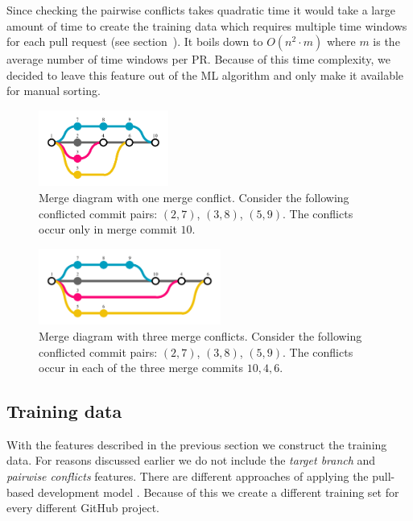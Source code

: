 Since checking the pairwise conflicts takes quadratic time it would take a large amount of time to create the training data which requires multiple time windows for each pull request (see section~\label{sec:training}).
It boils down to $O(n^2 \cdot m)$ where $m$ is the average number of time windows per PR.
Because of this time complexity, we decided to leave this feature out of the ML algorithm and only make it available for manual sorting.

\begin{figure}
  \centering
  \includegraphics[height=25mm, clip ,trim = 0mm 7mm 0mm 7mm]{../figs/conflicts-1.pdf}
  \caption[Merge diagram with one conflict]
   {Merge diagram with one merge conflict.
   Consider the following conflicted commit pairs: $(2,7)$, $(3,8)$, $(5,9)$.
   The conflicts occur only in merge commit $10$.}
  \label{fig:conflicts-1}
\end{figure}

\begin{figure}
  \centering
  \includegraphics[height=25mm, clip ,trim = 0mm 7mm 0mm 7mm]{../figs/conflicts-3.pdf}
  \caption[Merge diagram with three merge conflicts]
   {Merge diagram with three merge conflicts.
   Consider the following conflicted commit pairs: $(2,7)$, $(3,8)$, $(5,9)$.
   The conflicts occur in each of the three merge commits $10,4,6$.}
  \label{fig:conflicts-3}
\end{figure}

\subsection{Training data}
\label{sec:training}

With the features described in the previous section we construct the training data.
For reasons discussed earlier we do not include the \emph{target branch} and \emph{pairwise conflicts} features.
There are different approaches of applying the pull-based development model \cite{GPD14}.
Because of this we create a different training set for every different GitHub project.

